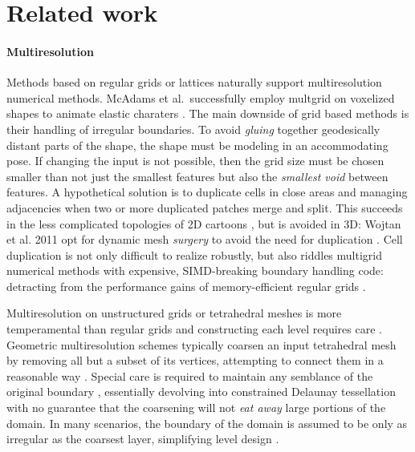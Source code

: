 \section{Related work}
\label{sec:related}


\paragraph{Multiresolution}
%
Methods based on regular grids or lattices naturally support multiresolution numerical methods.
%
McAdams et al.\ successfully employ multgrid on voxelized shapes to animate
elastic charaters \cite{McAdams:2011}.
%
The main downside of grid based methods is their handling of irregular
boundaries.
%
To avoid \emph{gluing} together geodesically distant parts of the shape, the
shape must be modeling in an accommodating pose. If changing the input is not
possible, then the grid size must be chosen smaller than not just the smallest
features but also the \emph{smallest void} between features.
%
A hypothetical solution is to duplicate cells in close areas and managing
adjacencies when two or more duplicated patches merge and split.
%
This succeeds in the less complicated topologies of 2D cartoons
\cite{Sykora09}, but is avoided in 3D: Wojtan et al. 2011 opt for dynamic mesh
\emph{surgery} to avoid the need for duplication \cite{wojtan2011liquid}.
%
Cell duplication is not only difficult to realize robustly, but also riddles
multigrid numerical methods with expensive, SIMD-breaking boundary handling
code: detracting from the performance gains of memory-efficient regular grids
\cite{Demmel04}.

Multiresolution on unstructured grids or tetrahedral meshes is more
temperamental than regular grids and constructing each level requires care
\cite{fish1995efficient}.
%
Geometric multiresolution schemes typically coarsen an input tetrahedral mesh
by removing all but a subset of its vertices, attempting to connect them in a
reasonable way \cite{guillard1993,Adams:1999:PMS}. Special care is required to
maintain any semblance of the original boundary \cite{Brune:2011}, essentially
devolving into constrained Delaunay tessellation with no guarantee that the
coarsening will not \emph{eat away} large portions of the domain.
%
In many scenarios, the boundary of the domain is assumed to be only as
irregular as the coarsest layer, simplifying level design \cite{feng1997non}.

%

